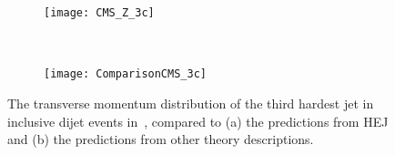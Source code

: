 	\begin{figure}[H]
	  \centering
	  \begin{subfigure}[b]{0.46\textwidth}
	    \texttt{[image: CMS\_Z\_3c]}
	    \caption{}
	    \label{fig:HEJ_CMS_7b}
	  \end{subfigure}
	  ~
	  \begin{subfigure}[b]{0.48\textwidth}
	    \texttt{[image: ComparisonCMS\_3c]}
	    \caption{}
	    \label{fig:MC_CMS_7b}
	  \end{subfigure}
	  \caption{The transverse momentum distribution of the third hardest jet in
	    inclusive dijet events in~\cite{Khachatryan:2014zya}, compared to (a) the
	    predictions from HEJ and (b) the predictions from other theory descriptions.}
	  \label{fig:CMS_3c}
	\end{figure}


